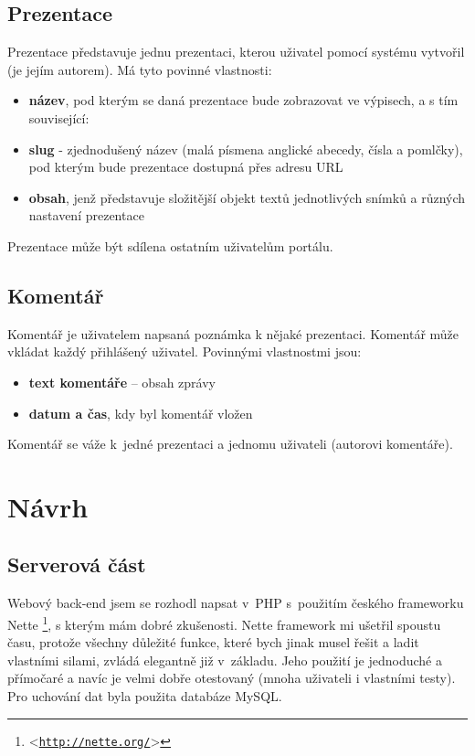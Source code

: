 \documentclass[11pt,twoside,a4paper]{book}
\let\oldUrl\url									%
\renewcommand\url[1]{<\texttt{\oldUrl{#1}}>}
\begin{document}
\section{Prezentace}
Prezentace představuje jednu prezentaci, kterou uživatel pomocí systému vytvořil (je jejím autorem). Má tyto povinné
vlastnosti:

\begin{itemize}
	\item \textbf{název}, pod kterým se daná prezentace bude zobrazovat ve výpisech, a s tím související:
	\item \textbf{slug} - zjednodušený název (malá písmena anglické abecedy, čísla a pomlčky), pod kterým bude prezentace dostupná přes adresu URL
	\item \textbf{obsah}, jenž představuje složitější objekt textů jednotlivých snímků a různých nastavení prezentace
\end{itemize}
Prezentace může být sdílena ostatním uživatelům portálu.

\section{Komentář}
Komentář je uživatelem napsaná poznámka k nějaké prezentaci. Komentář může vkládat každý přihlášený uživatel. Povinnými
vlastnostmi jsou:

\begin{itemize}
	\item \textbf{text komentáře} – obsah zprávy
	\item \textbf{datum a čas}, kdy byl komentář vložen
\end{itemize}
Komentář se váže k~jedné prezentaci a jednomu uživateli (autorovi komentáře).



\chapter{Návrh}

\section{Serverová část}
Webový back-end jsem se rozhodl napsat v~PHP s~použitím českého frameworku Nette \footnote{\url{http://nette.org/}}, s kterým mám dobré zkušenosti. Nette framework mi ušetřil spoustu času, protože všechny důležité funkce, které bych jinak musel řešit a ladit vlastními silami, zvládá elegantně již v~základu. Jeho použití je jednoduché a přímočaré a navíc je velmi dobře otestovaný (mnoha uživateli i vlastními testy). Pro uchování dat byla použita databáze MySQL.
\end{document}
